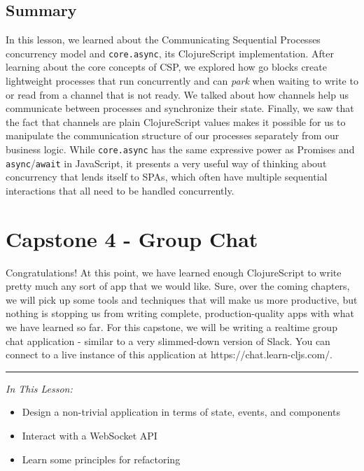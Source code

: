 \documentclass[10pt,twoside,openright]{memoir}
\begin{document}
\section{Summary}

In this lesson, we learned about the Communicating Sequential Processes
concurrency model and \texttt{core.async}, its ClojureScript
implementation. After learning about the core concepts of CSP, we
explored how go blocks create lightweight processes that run
concurrently and can \emph{park} when waiting to write to or read from a
channel that is not ready. We talked about how channels help us
communicate between processes and synchronize their state. Finally, we
saw that the fact that channels are plain ClojureScript values makes it
possible for us to manipulate the communication structure of our
processes separately from our business logic. While \texttt{core.async}
has the same expressive power as Promises and
\texttt{async}/\texttt{await} in JavaScript, it presents a very useful
way of thinking about concurrency that lends itself to SPAs, which often
have multiple sequential interactions that all need to be handled
concurrently.

\chapter{Capstone 4 - Group Chat}

Congratulations! At this point, we have learned enough ClojureScript to
write pretty much any sort of app that we would like. Sure, over the
coming chapters, we will pick up some tools and techniques that will
make us more productive, but nothing is stopping us from writing
complete, production-quality apps with what we have learned so far. For
this capstone, we will be writing a realtime group chat application -
similar to a very slimmed-down version of Slack. You can connect to a
live instance of this application at https://chat.learn-cljs.com/.

\begin{center}\rule{0.5\linewidth}{0.5pt}\end{center}

\emph{In This Lesson:}

\begin{itemize}
\tightlist
\item
  Design a non-trivial application in terms of state, events, and
  components
\item
  Interact with a WebSocket API
\item
  Learn some principles for refactoring
\end{itemize}
\end{document}
